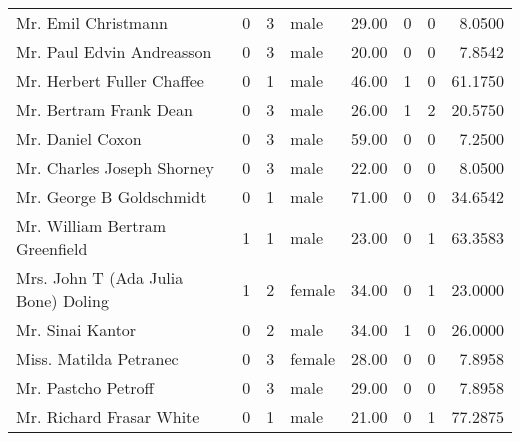 \begin{tabular}{lrrlrrrr}
Mr. Emil Christmann                                &         0 &       3 &    male &  29.00 &                        0 &                        0 &    8.0500 \\
Mr. Paul Edvin Andreasson                          &         0 &       3 &    male &  20.00 &                        0 &                        0 &    7.8542 \\
Mr. Herbert Fuller Chaffee                         &         0 &       1 &    male &  46.00 &                        1 &                        0 &   61.1750 \\
Mr. Bertram Frank Dean                             &         0 &       3 &    male &  26.00 &                        1 &                        2 &   20.5750 \\
Mr. Daniel Coxon                                   &         0 &       3 &    male &  59.00 &                        0 &                        0 &    7.2500 \\
Mr. Charles Joseph Shorney                         &         0 &       3 &    male &  22.00 &                        0 &                        0 &    8.0500 \\
Mr. George B Goldschmidt                           &         0 &       1 &    male &  71.00 &                        0 &                        0 &   34.6542 \\
Mr. William Bertram Greenfield                     &         1 &       1 &    male &  23.00 &                        0 &                        1 &   63.3583 \\
Mrs. John T (Ada Julia Bone) Doling                &         1 &       2 &  female &  34.00 &                        0 &                        1 &   23.0000 \\
Mr. Sinai Kantor                                   &         0 &       2 &    male &  34.00 &                        1 &                        0 &   26.0000 \\
Miss. Matilda Petranec                             &         0 &       3 &  female &  28.00 &                        0 &                        0 &    7.8958 \\
Mr. Pastcho Petroff                                &         0 &       3 &    male &  29.00 &                        0 &                        0 &    7.8958 \\
Mr. Richard Frasar White                           &         0 &       1 &    male &  21.00 &                        0 &                        1 &   77.2875 \\

\end{tabular}
